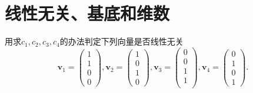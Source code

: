 ﻿\documentclass{book} \usepackage{exsheets} \usepackage{xeCJK}
\begin{document}
\section{线性无关、基底和维数}
\begin{question}
  用求$c_1,c_2,c_3,c_4$的办法判定下列向量是否线性无关
$$
\mathbf{v}_1=
\begin{pmatrix}
  1\\
  1\\
  0\\
  0
\end{pmatrix},\mathbf{v}_2=
\begin{pmatrix}
  1\\
  0\\
  1\\
  0
\end{pmatrix},\mathbf{v}_3=
\begin{pmatrix}
  0\\
  0\\
  1\\
  1\\
\end{pmatrix},\mathbf{v}_4=
\begin{pmatrix}
  0\\
  1\\
  0\\
  1
\end{pmatrix}.
$$
\end{question}
\end{document}
